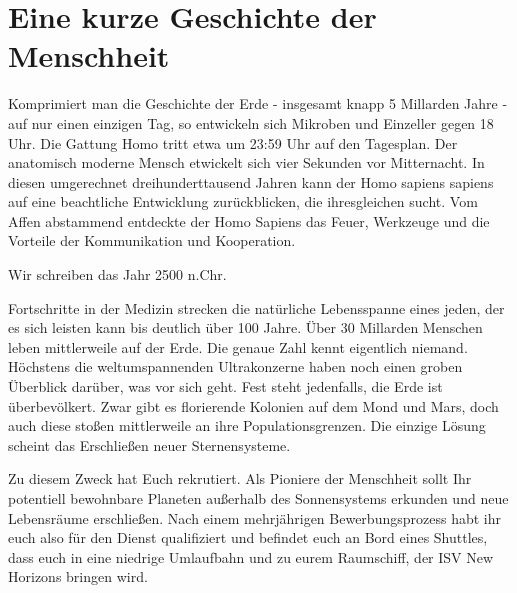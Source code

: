 
\chapter[Prolog]{Eine kurze Geschichte der Menschheit}

\begin{say}
Komprimiert man die Geschichte der Erde - insgesamt knapp 5 Millarden Jahre - auf nur einen einzigen Tag, so entwickeln sich Mikroben und Einzeller gegen
18 Uhr. Die Gattung Homo tritt etwa um 23:59 Uhr auf den Tagesplan. Der anatomisch moderne Mensch etwickelt sich vier Sekunden vor Mitternacht. In diesen
umgerechnet dreihunderttausend Jahren kann der Homo sapiens sapiens auf eine beachtliche Entwicklung zurückblicken, die ihresgleichen sucht. Vom Affen
abstammend entdeckte der Homo Sapiens das Feuer, Werkzeuge und die Vorteile der Kommunikation und Kooperation. 

Wir schreiben das Jahr 2500 n.Chr.

Fortschritte in der Medizin strecken die natürliche Lebensspanne eines jeden, der es sich leisten kann bis deutlich über 100 Jahre. Über 30 Millarden
Menschen leben mittlerweile auf der Erde. Die genaue Zahl kennt eigentlich niemand. Höchstens die weltumspannenden Ultrakonzerne haben noch einen groben
Überblick darüber, was vor sich geht. Fest steht jedenfalls, die Erde ist überbevölkert. Zwar gibt es florierende Kolonien auf dem Mond und Mars, doch auch
diese stoßen mittlerweile an ihre Populationsgrenzen. Die einzige Lösung scheint das Erschließen neuer Sternensysteme.

Zu diesem Zweck hat  Euch rekrutiert. Als Pioniere der Menschheit sollt Ihr potentiell bewohnbare Planeten außerhalb des Sonnensystems
erkunden und neue Lebensräume erschließen. Nach einem mehrjährigen Bewerbungsprozess habt ihr euch also für den Dienst qualifiziert und befindet euch an
Bord eines Shuttles, dass euch in eine niedrige Umlaufbahn und zu eurem Raumschiff, der ISV New Horizons bringen wird.
\end{say}
